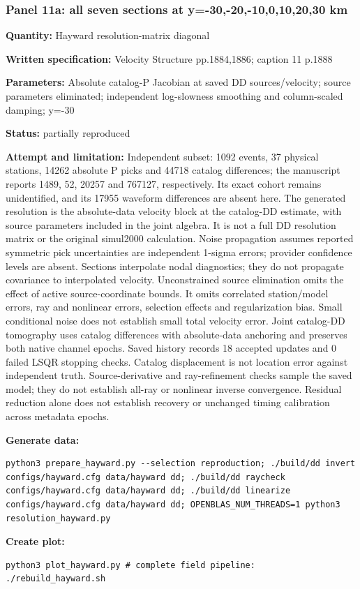 \subsubsection*{Panel 11a: all seven sections at y=-30,-20,-10,0,10,20,30 km}
\noindent\textbf{Quantity:} Hayward resolution-matrix diagonal\par
\noindent\textbf{Written specification:} Velocity Structure pp.1884,1886; caption 11 p.1888\par
\noindent\textbf{Parameters:} Absolute catalog-P Jacobian at saved DD sources/velocity; source parameters eliminated; independent log-slowness smoothing and column-scaled damping; y=-30\par
\noindent\textbf{Status:} partially reproduced\par
\noindent\textbf{Attempt and limitation:} Independent subset: 1092 events, 37 physical stations, 14262 absolute P picks and 44718 catalog differences; the manuscript reports 1489, 52, 20257 and 767127, respectively. Its exact cohort remains unidentified, and its 17955 waveform differences are absent here. The generated resolution is the absolute-data velocity block at the catalog-DD estimate, with source parameters included in the joint algebra. It is not a full DD resolution matrix or the original simul2000 calculation. Noise propagation assumes reported symmetric pick uncertainties are independent 1-sigma errors; provider confidence levels are absent. Sections interpolate nodal diagnostics; they do not propagate covariance to interpolated velocity. Unconstrained source elimination omits the effect of active source-coordinate bounds. It omits correlated station/model errors, ray and nonlinear errors, selection effects and regularization bias. Small conditional noise does not establish small total velocity error. Joint catalog-DD tomography uses catalog differences with absolute-data anchoring and preserves both native channel epochs. Saved history records 18 accepted updates and 0 failed LSQR stopping checks. Catalog displacement is not location error against independent truth. Source-derivative and ray-refinement checks sample the saved model; they do not establish all-ray or nonlinear inverse convergence. Residual reduction alone does not establish recovery or unchanged timing calibration across metadata epochs.\par
\noindent\textbf{Generate data:}
\begin{lstlisting}
python3 prepare_hayward.py --selection reproduction; ./build/dd invert configs/hayward.cfg data/hayward dd; ./build/dd raycheck configs/hayward.cfg data/hayward dd; ./build/dd linearize configs/hayward.cfg data/hayward dd; OPENBLAS_NUM_THREADS=1 python3 resolution_hayward.py
\end{lstlisting}
\noindent\textbf{Create plot:}
\begin{lstlisting}
python3 plot_hayward.py # complete field pipeline: ./rebuild_hayward.sh
\end{lstlisting}
